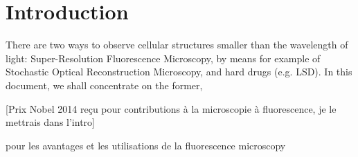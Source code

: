 \section{Introduction}
There are two ways to observe cellular structures smaller than the wavelength of light:
Super-Resolution Fluorescence Microscopy, by means for example of Stochastic Optical Reconstruction Microscopy, and hard drugs (e.g. LSD).
In this document, we shall concentrate on the former,

[Prix Nobel 2014 reçu pour contributions à la microscopie à fluorescence, je le mettrais dans l'intro]

\cite{sachl_introduction_2022} pour les avantages et les utilisations de la fluorescence microscopy
